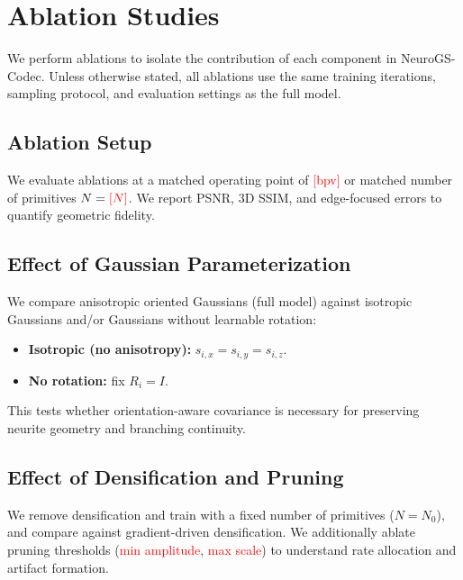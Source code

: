 \documentclass[11pt]{article}
\begin{document}
\section{Ablation Studies}
\label{sec:ablations}
We perform ablations to isolate the contribution of each component in NeuroGS-Codec.
Unless otherwise stated, all ablations use the same training iterations, sampling protocol, and evaluation settings as the full model.

\subsection{Ablation Setup}
\label{sec:ablation_setup}
We evaluate ablations at a matched operating point of \textcolor{red}{[bpv]} or matched number of primitives $N=\textcolor{red}{[N]}$.
We report PSNR, 3D SSIM, and edge-focused errors to quantify geometric fidelity.

\subsection{Effect of Gaussian Parameterization}
\label{sec:ablation_param}
We compare anisotropic oriented Gaussians (full model) against isotropic Gaussians and/or Gaussians without learnable rotation:
\begin{itemize}
  \item \textbf{Isotropic (no anisotropy):} $s_{i,x}=s_{i,y}=s_{i,z}$.
  \item \textbf{No rotation:} fix $R_i=I$.
\end{itemize}
This tests whether orientation-aware covariance is necessary for preserving neurite geometry and branching continuity.

\subsection{Effect of Densification and Pruning}
\label{sec:ablation_densify}
We remove densification and train with a fixed number of primitives ($N=N_0$), and compare against gradient-driven densification.
We additionally ablate pruning thresholds (\textcolor{red}{min amplitude}, \textcolor{red}{max scale}) to understand rate allocation and artifact formation.
\end{document}
